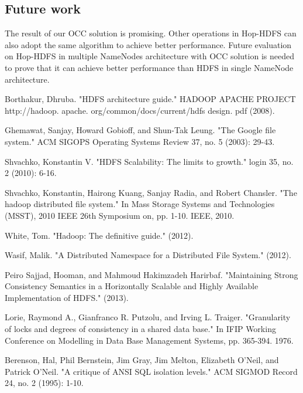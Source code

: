 \documentclass[runningheads,a4paper]{llncs}
\begin{document}
\subsection{Future work}
The result of our OCC solution is promising. Other operations in Hop-HDFS can also adopt the same algorithm to achieve better performance. Future evaluation on Hop-HDFS in multiple NameNodes architecture with OCC solution is needed to prove that it can achieve better performance than HDFS in single NameNode architecture.



\begin{thebibliography}{4}

 Borthakur, Dhruba. "HDFS architecture guide." HADOOP APACHE PROJECT http://hadoop. apache. org/common/docs/current/hdfs design. pdf (2008).

 Ghemawat, Sanjay, Howard Gobioff, and Shun-Tak Leung. "The Google file system." ACM SIGOPS Operating Systems Review 37, no. 5 (2003): 29-43.

 Shvachko, Konstantin V. "HDFS Scalability: The limits to growth." login 35, no. 2 (2010): 6-16.

 Shvachko, Konstantin, Hairong Kuang, Sanjay Radia, and Robert Chansler. "The hadoop distributed file system." In Mass Storage Systems and Technologies (MSST), 2010 IEEE 26th Symposium on, pp. 1-10. IEEE, 2010.

 White, Tom. "Hadoop: The definitive guide." (2012).

 Wasif, Malik. "A Distributed Namespace for a Distributed File System." (2012).

 Peiro Sajjad, Hooman, and Mahmoud Hakimzadeh Harirbaf. "Maintaining Strong Consistency Semantics in a Horizontally Scalable and Highly Available Implementation of HDFS." (2013).

 Lorie, Raymond A., Gianfranco R. Putzolu, and Irving L. Traiger. "Granularity of locks and degrees of consistency in a shared data base." In IFIP Working Conference on Modelling in Data Base Management Systems, pp. 365-394. 1976.

 Berenson, Hal, Phil Bernstein, Jim Gray, Jim Melton, Elizabeth O'Neil, and Patrick O'Neil. "A critique of ANSI SQL isolation levels." ACM SIGMOD Record 24, no. 2 (1995): 1-10.

\end{thebibliography}
\end{document}
